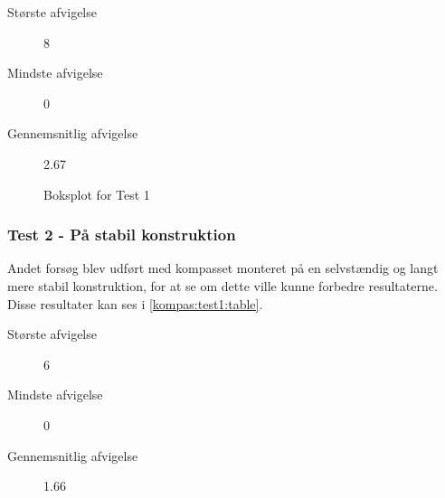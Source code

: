 \begin{description}
\item[Største afvigelse]{8\dg}
\item[Mindste afvigelse]{0\dg}
\item[Gennemsnitlig afvigelse]{2.67}
\end{description}

\begin{figure}[h]
\centering
{}
\caption{Boksplot for Test 1}
\label{kompas:test1:boksplot}
\end{figure}

\subsubsection{Test 2 - På stabil konstruktion}
Andet forsøg blev udført med kompasset monteret på en selvstændig og langt mere stabil konstruktion, for at se om dette ville kunne forbedre resultaterne.
Disse resultater kan ses i \cref{kompas:test1:table}.

\begin{description}
\item[Største afvigelse]{6\dg}
\item[Mindste afvigelse]{0\dg}
\item[Gennemsnitlig afvigelse]{1.66}
\end{description}



